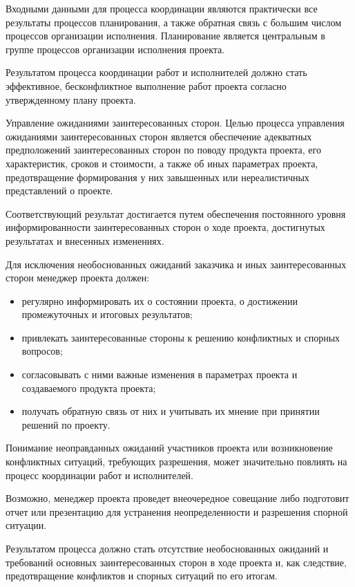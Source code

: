 Входными данными для процесса координации являются практи­чески все результаты процессов планирования, а также обратная связь с большим числом процессов организации исполнения.
Планирование является центральным в группе процессов организации исполнения проекта.

Результатом процесса координации работ и исполнителей должно стать эффективное, бесконфликтное выполнение работ проекта со­гласно утвержденному плану проекта.

Управление ожиданиями заинтересованных сторон.
Целью процесса управления ожиданиями заинтересованных сторон является обеспечение адекватных предположений заинтересованных сторон по поводу продукта проекта, его характеристик, сроков и стои­мости, а также об иных параметрах проекта, предотвращение фор­мирования у них завышенных или нереалистичных представлений о проекте.

Соответствующий результат достигается путем обеспечения посто­янного уровня информированности заинтересованных сторон о ходе проекта, достигнутых результатах и внесенных изменениях.

Для исключения необоснованных ожиданий заказчика и иных за­интересованных сторон менеджер проекта должен:
\begin{itemize}
	\item регулярно информировать их о состоянии проекта, о достижении промежуточных и итоговых результатов;
	\item привлекать заинтересованные стороны к решению конфликтных и спорных вопросов;
	\item согласовывать с ними важные изменения в параметрах проекта и создаваемого продукта проекта;
	\item получать обратную связь от них и учитывать их мнение при при­нятии решений по проекту.
\end{itemize}

Понимание неоправданных ожиданий участников проекта или возник­новение конфликтных ситуаций, требующих разрешения, может зна­чительно повлиять на процесс координации работ и исполнителей.

Возможно, менеджер проекта проведет внеочередное совещание либо подготовит отчет или презентацию для устранения неопределен­ности и разрешения спорной ситуации.

Результатом процесса должно стать отсутствие необоснованных ожи­даний и требований основных заинтересованных сторон в ходе проек­та и, как следствие, предотвращение конфликтов и спорных ситуаций по его итогам.

